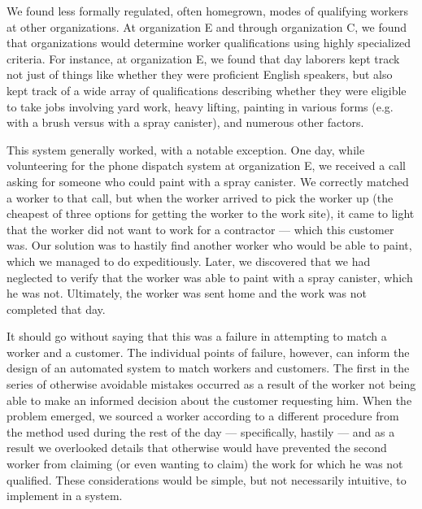 We found less formally regulated, often homegrown, modes of qualifying workers at other organizations.
At organization E and through organization C, we found that organizations would determine worker qualifications using highly specialized criteria.
For instance, at organization E, we found that day laborers kept track not just of things like whether they were proficient English speakers, but also kept track of a wide array of qualifications describing whether they were eligible to take jobs involving yard work, heavy lifting, painting in various forms (e.g.
with a brush versus with a spray canister), and numerous other factors.

This system generally worked, with a notable exception.
One day, while volunteering for the phone dispatch system at organization E, we received a call asking for someone who could paint with a spray canister.
We correctly matched a worker to that call, but when the worker arrived to pick the worker up (the cheapest of three options for getting the worker to the work site), it came to light that the worker did not want to work for a contractor
--- which this customer was.
Our solution was to hastily find another worker who would be able to paint, which we managed to do expeditiously.
Later, we discovered that we had neglected to verify that the worker was able to paint with a spray canister, which he was not.
Ultimately, the worker was sent home and the work was not completed that day.

It should go without saying that this was a failure in attempting to match a worker and a customer.
The individual points of failure, however, can inform the design of an automated system to match workers and customers.
The first in the series of otherwise avoidable mistakes occurred as a result of the worker not being able to make an informed decision about the customer requesting him.
When the problem emerged, we sourced a worker according to a different procedure from the method used during the rest of the day
--- specifically, hastily ---
and as a result we overlooked details that otherwise would have prevented the second worker from claiming (or even wanting to claim) the work for which he was not qualified.
These considerations would be simple, but not necessarily intuitive, to implement in a system.